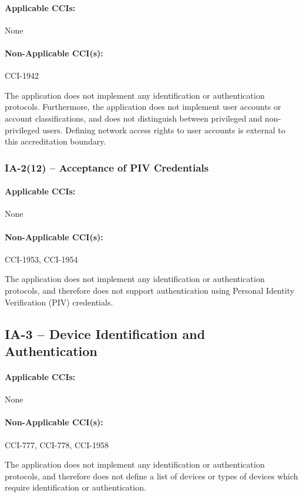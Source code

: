 \documentclass[letterpaper, 10pt, twoside]{article}
\begin{document}
\paragraph{Applicable CCIs:} None

\paragraph{Non-Applicable CCI(s):} CCI-1942

The application does not implement any identification or authentication protocols. Furthermore, the application does not implement user accounts or account classifications, and does not distinguish between privileged and non-privileged users. Defining network access rights to user accounts is external to this accreditation boundary.

\subsubsection{IA-2(12) -- Acceptance of PIV Credentials}

\paragraph{Applicable CCIs:} None

\paragraph{Non-Applicable CCI(s):} CCI-1953, CCI-1954

The application does not implement any identification or authentication protocols, and therefore does not support authentication using Personal Identity Verification (PIV) credentials.

\subsection{IA-3 -- Device Identification and Authentication}

\paragraph{Applicable CCIs:} None

\paragraph{Non-Applicable CCI(s):} CCI-777, CCI-778, CCI-1958

The application does not implement any identification or authentication protocols, and therefore does not define a list of devices or types of devices which require identification or authentication.
\end{document}
